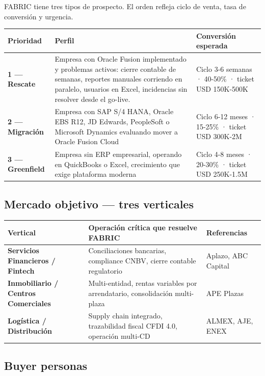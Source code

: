\documentclass[11pt, a4paper]{article}
\begin{document}
FABRIC tiene tres tipos de prospecto. El orden refleja ciclo de venta,
tasa de conversión y urgencia.

\begin{table}[h]
\centering
\begin{tabularx}{\linewidth}{>{\bfseries\ttfamily\color{accent}}l X >{\small}X}
\toprule
Prioridad & Perfil & Conversión esperada \\
\midrule
1 — Rescate &
  Empresa con Oracle Fusion implementado y problemas activos: cierre contable de semanas,
  reportes manuales corriendo en paralelo, usuarios en Excel, incidencias sin resolver
  desde el go-live. &
  Ciclo 3-6 semanas · 40-50\% · ticket USD 150K-500K \\
2 — Migración &
  Empresa con SAP S/4 HANA, Oracle EBS R12, JD Edwards, PeopleSoft o
  Microsoft Dynamics evaluando mover a Oracle Fusion Cloud &
  Ciclo 6-12 meses · 15-25\% · ticket USD 300K-2M \\
3 — Greenfield &
  Empresa sin ERP empresarial, operando en QuickBooks o Excel, crecimiento
  que exige plataforma moderna &
  Ciclo 4-8 meses · 20-30\% · ticket USD 250K-1.5M \\
\bottomrule
\end{tabularx}
\end{table}

\subsection{Mercado objetivo — tres verticales}

\begin{table}[h]
\centering
\begin{tabularx}{\linewidth}{>{\bfseries}l X l}
\toprule
Vertical & Operación crítica que resuelve FABRIC & Referencias \\
\midrule
Servicios Financieros / Fintech &
  Conciliaciones bancarias, compliance CNBV, cierre contable regulatorio &
  Aplazo, ABC Capital \\
Inmobiliario / Centros Comerciales &
  Multi-entidad, rentas variables por arrendatario, consolidación multi-plaza &
  APE Plazas \\
Logística / Distribución &
  Supply chain integrado, trazabilidad fiscal CFDI 4.0, operación multi-CD &
  ALMEX, AJE, ENEX \\
\bottomrule
\end{tabularx}
\end{table}

\subsection{Buyer personas}
\end{document}
